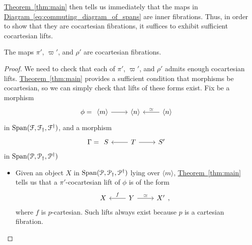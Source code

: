 \documentclass[main.tex]{subfiles}
\begin{document}
\hyperref[thm:main]{Theorem~\ref*{thm:main}} then tells us immediately that the maps in \hyperref[eq:commuting_diagram_of_spans]{Diagram~\ref*{eq:commuting_diagram_of_spans}} are inner fibrations. Thus, in order to show that they are cocartesian fibrations, it suffices to exhibit sufficient cocartesian lifts.

\begin{proposition}
  The maps $\pi'$, $\varpi'$, and $\rho'$ are cocartesian fibrations.
\end{proposition}
\begin{proof}
  We need to check that each of $\pi'$, $\varpi'$, and $\rho'$ admits enough cocartesian lifts. \hyperref[thm:main]{Theorem~\ref*{thm:main}} provides a sufficient condition that morphisms be cocartesian, so we can simply check that lifts of these forms exist. Fix be a morphism
  \begin{equation*}
    \phi =
    \begin{tikzcd}
      \langle m \rangle
      \arrow[r]
      & \langle n \rangle
      & \langle n \rangle
      \arrow[l, swap, "\simeq"]
    \end{tikzcd}
  \end{equation*}
  in $\mathrm{Span}(\mathcal{F}, \mathcal{F}_{\dagger}, \mathcal{F}^{\dagger})$, and a morphism
  \begin{equation*}
    \Gamma =
    \begin{tikzcd}
      S
      & T
      \arrow[l]
      \arrow[r]
      & S'
    \end{tikzcd}
  \end{equation*}
  in $\mathrm{Span}(\mathcal{P}, \mathcal{P}_{\dagger}, \mathcal{P}^{\dagger})$
  \begin{itemize}
    \item Given an object $X$ in $\mathrm{Span}(\mathcal{P}, \mathcal{P}_{\dagger}, \mathcal{P}^{\dagger})$ lying over $\langle m \rangle$, \hyperref[thm:main]{Theorem~\ref*{thm:main}} tells us that a $\pi'$-cocartesian lift of $\phi$ is of the form
      \begin{equation*}
        \begin{tikzcd}
          X
          & Y
          \arrow[l, swap, "f"]
          \arrow[r, "\simeq"]
          & X'
        \end{tikzcd},
      \end{equation*}
      where $f$ is $p$-cartesian. Such lifts always exist because $p$ is a cartesian fibration.


\end{itemize}
\end{proof}
\end{document}

